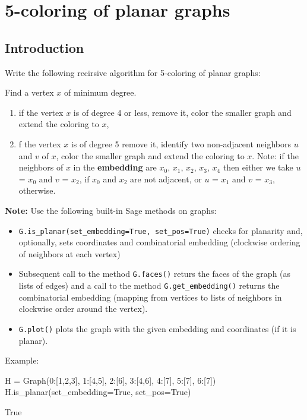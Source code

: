 \chapter{5-coloring of planar graphs}

\section{Introduction}

Write the following recirsive algorithm for 5-coloring of planar graphs:

\medskip
\noindent Find a vertex $x$ of minimum degree.
\begin{enumerate}
    \item if the vertex $x$ is of degree 4 or less, remove it, color the smaller graph and extend the coloring to $x$,
    \item f the vertex $x$ is of degree 5 remove it, identify two non-adjacent neighbors $u$ and $v$ of $x$, color the smaller graph and extend the coloring to $x$. Note: if the neighbors of $x$ in the \textbf{embedding} are $x_0$, $x_1$, $x_2$, $x_3$, $x_4$ then either we take $u$ = $x_0$ and $v$ = $x_2$, if $x_0$ and $x_2$ are not adjacent, or $u$ = $x_1$ and $v$ = $x_3$, otherwise.
\end{enumerate}

\medskip
\noindent \textbf{Note:}
Use the following built-in Sage methods on graphs:
\begin{itemize}
\item \verb|G.is_planar(set_embedding=True, set_pos=True)| checks for planarity and, optionally, sets coordinates and combinatorial embedding (clockwise ordering of neighbors at each vertex)
\item  Subsequent call to the method \verb|G.faces()| returs the faces of the graph (as lists of edges) and a call to the method \verb|G.get_embedding()| returns the combinatorial embedding (mapping from vertices to lists of neighbors in clockwise order around the vertex).
\item  \verb|G.plot()| plots the graph with the given embedding and coordinates (if it is planar).
\end{itemize}

\medskip
Example:
\begin{sageCell}
    H = Graph({0:[1,2,3], 1:[4,5], 2:[6], 3:[4,6], 4:[7], 5:[7], 6:[7]})
    H.is_planar(set_embedding=True, set_pos=True)
\end{sageCell}
\begin{outCell}
    True
\end{outCell}

